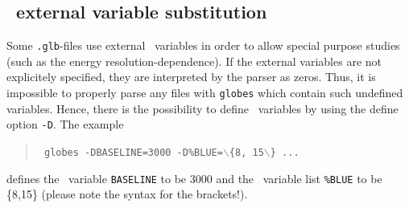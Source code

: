 \subsection*{\AEDL\ external variable substitution}

Some {\tt .glb}-files use external \AEDL\ variables in order to allow
special purpose studies (such as the energy resolution-dependence). If 
the external variables are not explicitely specified, they are
interpreted by the parser as zeros. Thus, it is impossible to properly
parse any files with {\tt globes} which contain such undefined variables. 
Hence, there is the possibility to define \AEDL\ variables by using the define option {\tt -D}. The example
\begin{quote}
{\tt
globes -DBASELINE=3000 -D\%BLUE=$\backslash$\{8, 15$\backslash$\} ...
}
\end{quote}
defines the \AEDL\ variable {\tt BASELINE} to be $3000$ and the \AEDL\ variable list
{\tt \%BLUE} to be \{8,15\} (please note the syntax for the brackets!).

